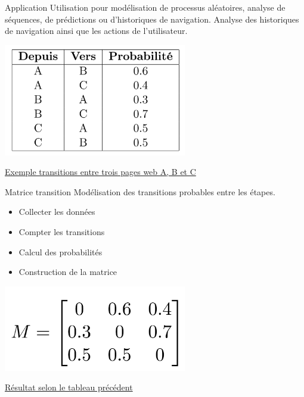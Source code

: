 \begin{frame}{Application}
	\vspace*{-0.3cm}
	Utilisation pour modélisation de processus aléatoires, analyse de séquences, de prédictions ou d'historiques de navigation.
	Analyse des historiques de navigation ainsi que les actions de l'utilisateur.

	\begin{center}
		\includegraphics[width=0.6\textwidth]{images/tableau_proba_markov.png}
		\par
		\uline{Exemple transitions entre trois pages web A, B et C}
	\end{center}
\end{frame}

\begin{frame}{Matrice transition}
	Modélisation des transitions probables entre les étapes.
	\begin{itemize}
		\item Collecter les données
		\item Compter les transitions
		\item Calcul des probabilités
		\item Construction de la matrice
	\end{itemize}
	\begin{center}
		\includegraphics[width=0.6\textwidth]{images/matrice_transition.png}
		\par
		\uline{Résultat selon le tableau précédent}
	\end{center}
\end{frame}

